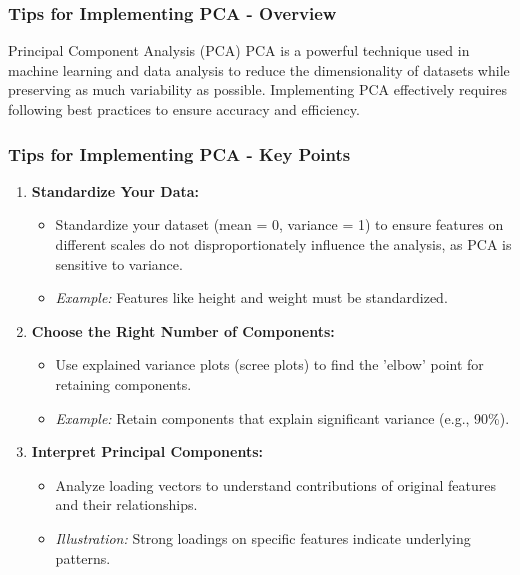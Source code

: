 \documentclass[aspectratio=169]{beamer}
\begin{document}
\begin{frame}[fragile]
    \frametitle{Tips for Implementing PCA - Overview}
    \begin{block}{Principal Component Analysis (PCA)}
        PCA is a powerful technique used in machine learning and data analysis to reduce the dimensionality of datasets while preserving as much variability as possible. Implementing PCA effectively requires following best practices to ensure accuracy and efficiency.
    \end{block}
\end{frame}

\begin{frame}[fragile]
    \frametitle{Tips for Implementing PCA - Key Points}
    \begin{enumerate}
        \item \textbf{Standardize Your Data:}
        \begin{itemize}
            \item Standardize your dataset (mean = 0, variance = 1) to ensure features on different scales do not disproportionately influence the analysis, as PCA is sensitive to variance.
            \item \textit{Example:} Features like height and weight must be standardized.
        \end{itemize}

        \item \textbf{Choose the Right Number of Components:}
        \begin{itemize}
            \item Use explained variance plots (scree plots) to find the 'elbow' point for retaining components.
            \item \textit{Example:} Retain components that explain significant variance (e.g., 90\%).
        \end{itemize}
        
        \item \textbf{Interpret Principal Components:}
        \begin{itemize}
            \item Analyze loading vectors to understand contributions of original features and their relationships.
            \item \textit{Illustration:} Strong loadings on specific features indicate underlying patterns.
        \end{itemize}
    \end{enumerate}
\end{frame}
\end{document}
